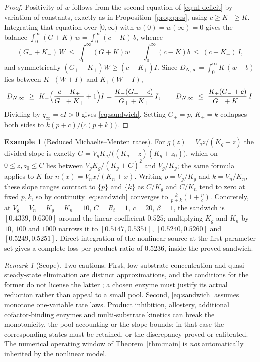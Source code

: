 \documentclass[11pt]{article}
\theoremstyle{definition}
\newtheorem{example}[theorem]{Example}
\theoremstyle{remark}
\newtheorem{remark}[theorem]{Remark}
\begin{document}
\begin{proof}
Positivity of $w$ follows from the second equation of \eqref{eq:nl-deficit} by
variation of constants, exactly as in Proposition~\ref{prop:pres}, using
$c\ge K_+\ge K$. Integrating that equation over $[0,\infty)$ with
$w(0)=w(\infty)=0$ gives the balance
$\int_0^\infty(G+K)\,w=\int_0^\infty(c-K)\,b$, whence
\[
(G_-+K_-)\,W\ \le\ \int_0^\infty (G+K)w\ =\ \int_0^\infty(c-K)b\ \le\ (c-K_-)\,I,
\]
and symmetrically $(G_++K_+)W\ge(c-K_+)I$. Since
$D_{N,\infty}=\int_0^\infty K\,(w+b)$ lies between $K_-(W+I)$ and $K_+(W+I)$,
\[
D_{N,\infty}\ \ge\ K_-\Bigl(\frac{c-K_+}{G_++K_+}+1\Bigr)I
=\frac{K_-(G_++c)}{G_++K_+}\,I,
\qquad
D_{N,\infty}\ \le\ \frac{K_+(G_-+c)}{G_-+K_-}\,I .
\]
Dividing by $q_\infty=cI>0$ gives \eqref{eq:sandwich}. Setting
$G_\pm=p$, $K_\pm=k$ collapses both sides to $k(p+c)/\bigl(c(p+k)\bigr)$.
\end{proof}

\begin{example}[Reduced Michaelis--Menten rates]\label{ex:mm}
For $g(z)=V_gz/(K_g+z)$ the divided slope is exactly
$G=V_gK_g/\bigl((K_g+z)(K_g+z_0)\bigr)$, which on $0\le z,z_0\le C$ lies between
$V_gK_g/(K_g+C)^2$ and $V_g/K_g$; the same formula applies to $K$ for
$n(x)=V_nx/(K_n+x)$. Writing $p=V_g/K_g$ and $k=V_n/K_n$, these slope ranges
contract to $\{p\}$ and $\{k\}$ as $C/K_g$ and $C/K_n$ tend to zero at fixed
$p,k$, so by continuity \eqref{eq:sandwich} converges to
$\frac{k}{p+k}(1+\frac pc)$. Concretely, at $V_g=V_n=K_g=K_n=10$, $C=R_t=1$,
$c=20$, $\beta=1$, the sandwich is $[0.4339,\,0.6300]$ around the linear
coefficient $0.525$; multiplying $K_g$ and $K_n$ by $10$, $100$ and $1000$
narrows it to $[0.5147,0.5351]$, $[0.5240,0.5260]$ and $[0.5249,0.5251]$.
Direct integration of the nonlinear source at the first parameter set gives a
complete-loss-per-product ratio of $0.5236$, inside the proved sandwich.
\end{example}

\begin{remark}[Scope]
Two cautions. First, low substrate concentration and quasi-steady-state
elimination are distinct approximations, and the conditions for the former do
not license the latter \citep{segel1989, low2024}; a chosen enzyme must justify
its actual reduction rather than appeal to a small pool. Second,
\eqref{eq:sandwich} assumes monotone one-variable rate laws. Product inhibition,
allostery, additional cofactor-binding enzymes and multi-substrate kinetics can
break the monotonicity, the pool accounting or the slope bounds; in that case the
corresponding states must be retained, or the discrepancy proved or calibrated.
The numerical operating window of Theorem~\ref{thm:main} is \emph{not}
automatically inherited by the nonlinear model.
\end{remark}
\end{document}
